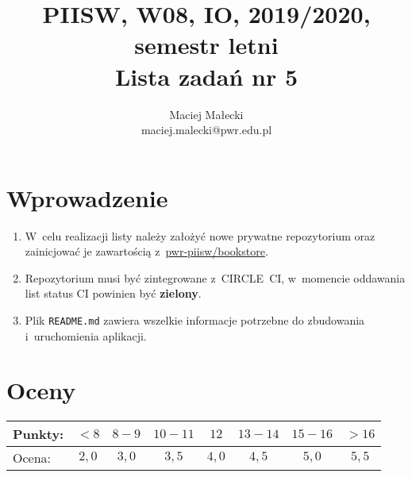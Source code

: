 \documentclass[12pt]{article}
\title{PIISW, W08, IO, 2019/2020, semestr letni\\Lista zadań nr 5}
\author{Maciej Małecki\\ \small maciej.malecki@pwr.edu.pl}
\begin{document}
    \maketitle

    \section*{Wprowadzenie}
        \begin{enumerate}
            \item W~celu realizacji listy należy założyć nowe prywatne repozytorium oraz zainicjować je zawartością z~\href{https://github.com/pwr-piisw/bookstore}{pwr-piisw/bookstore}.
			\item Repozytorium musi być zintegrowane z~CIRCLE~CI, w~momencie oddawania list status CI powinien być \textbf{zielony}.
			\item Plik \texttt{README.md} zawiera wszelkie informacje potrzebne do zbudowania i~uruchomienia aplikacji.
        \end{enumerate}

    \section*{Oceny}
    \begin{tabular}{|l|c|c|c|c|c|c|c|}
        \hline
        Punkty: & $<8$ & $8-9$ & $10-11$ & $12$ & $13-14$ & $15-16$ & $>16$ \\
        \hline
        Ocena:  & $2,0$ & $3,0$ & $3,5$ & $4,0$ & $4,5$ & $5,0$ & $5,5$ \\
        \hline
    \end{tabular}
\end{document}
